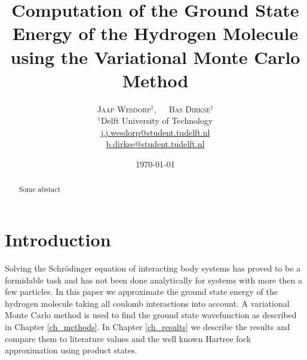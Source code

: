 \documentclass[twoside]{article}
\title{\vspace{-15mm}\fontsize{18pt}{10pt}\selectfont\textbf{Computation of the Ground State Energy of the Hydrogen Molecule using the Variational Monte Carlo Method}} %
\author{
	\large
	\textsc{Jaap Wesdorp}$^\dagger$, $\hspace{10pt}$ \textsc{Bas Dirkse}$^\dagger$ \\ %
	\normalsize $^\dagger$Delft University of Technology \\ %
	\normalsize \href{mailto:j.j.wesdorp@student.tudelft.nl}{j.j.wesdorp@student.tudelft.nl} \\
	\normalsize \href{mailto:b.dirkse@student.tudelft.nl}{b.dirkse@student.tudelft.nl} 
}
\date{\today\vspace{-8mm}}
\begin{document}


\maketitle %
\thispagestyle{firststyle} %


\begin{abstract}
\noindent  
Some abstact

	
\end{abstract}


\section{Introduction}
Solving the Schr\"odinger equation of interacting body systems has proved to be a formidable task and has not been done analytically for systems with more then a few particles. In this paper we approximate the ground state energy of the hydrogen molecule taking all coulomb interactions into account. A variational Monte Carlo method  is used to find the ground state wavefunction as described in Chapter \ref{ch_methods}. In Chapter \ref{ch_results} we describe the results and compare them to literature values and the well known Hartree fock approximation using product states. 

\end{document}
